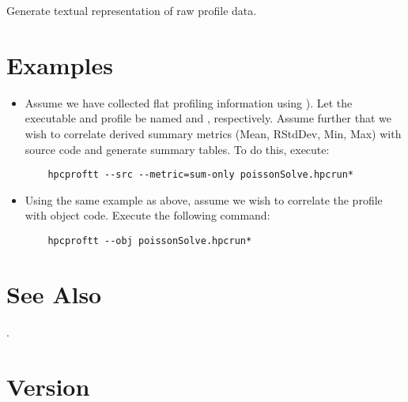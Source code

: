 \documentclass[english]{article}
\begin{document}
\begin{Description}
\item[\Opt{--dump}] Generate textual representation of raw profile data.
\end{Description}


\section{Examples}

\begin{itemize}

\item Assume we have collected flat profiling information using ).
Let the executable and profile be named  and , respectively.
Assume further that we wish to correlate derived summary metrics (Mean, RStdDev, Min, Max) with source code and generate summary tables.
To do this, execute:
\begin{verbatim}
    hpcproftt --src --metric=sum-only poissonSolve.hpcrun*
\end{verbatim}

\item Using the same example as above, assume we wish to correlate the profile with object code.  Execute the following command:
\begin{verbatim}
    hpcproftt --obj poissonSolve.hpcrun*
\end{verbatim}

\end{itemize}


\section{See Also}

.

\section{Version}
\end{document}

